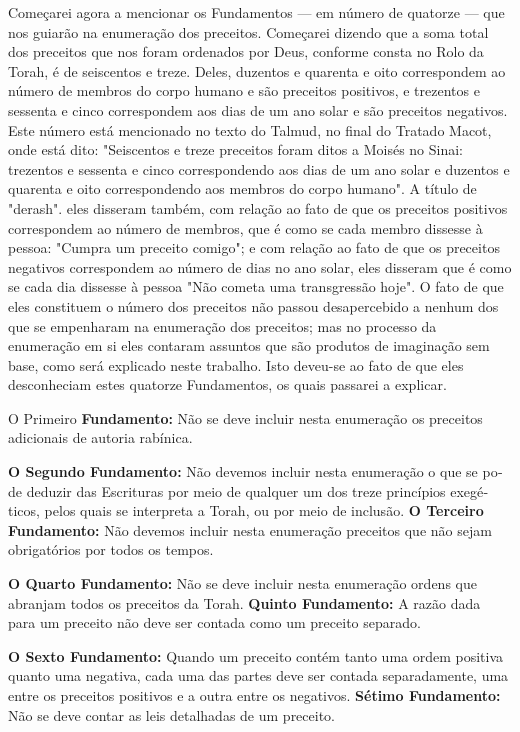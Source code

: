 \begin{itemize}
\begin{enumrate}
Começarei agora a mencionar os Fundamentos --- em número de qua­torze
--- que nos guiarão na enumeração dos preceitos. Começarei dizendo que a
soma total dos preceitos que nos foram ordenados por Deus, conforme
cons­ta no Rolo da Torah, é de seiscentos e treze. Deles, duzentos e
quarenta e oito correspondem ao número de membros do corpo humano e são
preceitos posi­tivos, e trezentos e sessenta e cinco correspondem aos
dias de um ano solar e são preceitos negativos. Este número está
mencionado no texto do Talmud, no final do Tratado Macot, onde está
dito: "Seiscentos e treze preceitos foram ditos a Moisés no Sinai:
trezentos e sessenta e cinco correspondendo aos dias de um ano solar e
duzentos e quarenta e oito correspondendo aos membros do corpo humano".
A título de "derash". eles disseram também, com
relação ao fato de que os preceitos positivos correspondem ao número de
membros, que é como se cada membro dissesse à pessoa: "Cumpra um
preceito comi­go"; e com relação ao fato de que os preceitos negativos
correspondem ao nú­mero de dias no ano solar, eles disseram que é como
se cada dia dissesse à pes­soa "Não cometa uma transgressão hoje". O
fato de que eles constituem o nú­mero dos preceitos não passou
desapercebido a nenhum dos que se empenha­ram na enumeração dos
preceitos; mas no processo da enumeração em si eles contaram assuntos
que são produtos de imaginação sem base, como será expli­cado neste
trabalho. Isto deveu-se ao fato de que eles desconheciam estes qua­torze
Fundamentos, os quais passarei a explicar.

O Primeiro \textbf{Fundamento:} Não se deve incluir nesta enumeração os
preceitos adicionais de autoria rabínica.

\textbf{O Segundo Fundamento:} Não devemos incluir nesta enumeração o
que se po­de deduzir das Escrituras por meio de qualquer um dos treze
princípios exegé­ticos, pelos quais se interpreta a Torah, ou por meio
de inclusão.
\textbf{O Terceiro Fundamento:} Não devemos incluir nesta enumeração
preceitos que não sejam obrigatórios por todos os tempos.

\textbf{O Quarto Fundamento:} Não se deve incluir nesta enumeração
ordens que abran­jam todos os preceitos da Torah.
 \textbf{Quinto Fundamento:} A razão dada para um preceito não deve ser
 contada como um preceito separado.


\textbf{O Sexto Fundamento:} Quando um preceito contém tanto uma ordem
positiva quanto uma negativa, cada uma das partes deve ser contada
separadamente, uma entre os preceitos positivos e a outra entre os
negativos.
 \textbf{Sétimo Fundamento:} Não se deve contar as leis detalhadas de
 um preceito.


\end{enumrate}
\end{itemize}
